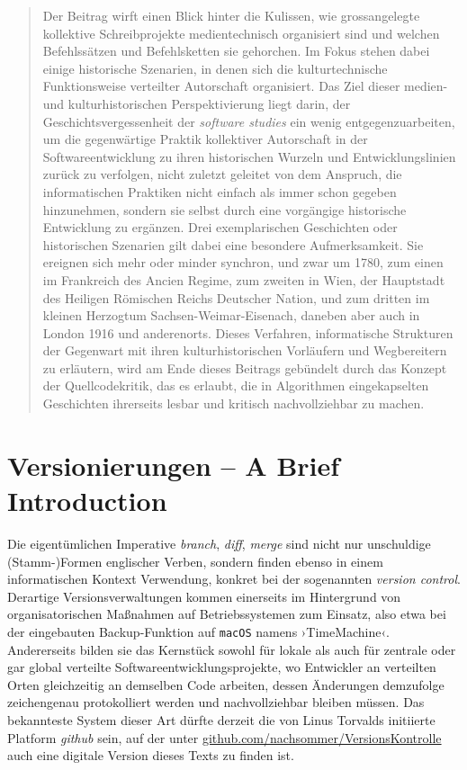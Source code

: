 \documentclass[a4paper,12pt]{article}
\newcommand{\inanf}[1]{›#1‹}
\begin{document}
\begin{abstract}
Der Beitrag wirft einen Blick hinter die Kulissen, wie grossangelegte kollektive Schreibprojekte medientechnisch organisiert sind und welchen Befehlssätzen und Befehlsketten sie gehorchen. Im Fokus stehen dabei einige historische Szenarien, in denen sich die kulturtechnische Funktionsweise verteilter Autorschaft organisiert. Das Ziel dieser medien- und kulturhistorischen Perspektivierung liegt darin, der Geschichtsvergessenheit der \emph{software studies} ein wenig entgegenzuarbeiten, um die gegenwärtige Praktik kollektiver Autorschaft in der Softwareentwicklung zu ihren historischen Wurzeln und Entwicklungslinien zurück zu verfolgen, nicht zuletzt geleitet von dem Anspruch, die informatischen Praktiken nicht einfach als immer schon gegeben hinzunehmen, sondern sie selbst durch eine vorgängige historische Entwicklung zu ergänzen. Drei exemplarischen Geschichten oder historischen Szenarien gilt dabei eine besondere Aufmerksamkeit. Sie ereignen sich mehr oder minder synchron, und zwar um 1780, zum einen im Frankreich des Ancien Regime, zum zweiten in Wien, der Hauptstadt des Heiligen Römischen Reichs Deutscher Nation, und zum dritten im kleinen Herzogtum Sachsen-Weimar-Eisenach, daneben aber auch in London 1916 und anderenorts. Dieses Verfahren, informatische Strukturen der Gegenwart mit ihren kulturhistorischen Vorläufern und Wegbereitern zu erläutern, wird am Ende dieses Beitrags gebündelt durch das Konzept der Quellcodekritik, das es erlaubt, die in Algorithmen eingekapselten Geschichten ihrerseits lesbar und kritisch nachvollziehbar zu machen. 
\end{abstract}



\section{Versionierungen – A Brief Introduction}

Die eigentümlichen Imperative \emph{branch}, \emph{diff}, \emph{merge} sind nicht nur unschuldige (Stamm-)Formen englischer Verben, sondern finden ebenso in einem informatischen Kontext Verwendung, konkret bei der sogenannten \emph{version control}. Derartige Versionsverwaltungen kommen einerseits im Hintergrund von organisatorischen Maßnahmen auf Betriebssystemen zum Einsatz, also etwa bei der eingebauten Backup-Funktion auf \verb+macOS+ namens \inanf{TimeMachine}. Andererseits bilden sie das Kernstück sowohl für lokale als auch für zentrale oder gar global verteilte Softwareentwicklungsprojekte, wo Entwickler an verteilten Orten gleichzeitig an demselben Code arbeiten, dessen Änderungen demzufolge zeichengenau protokolliert werden und nachvollziehbar bleiben müssen. Das bekannteste System dieser Art dürfte derzeit die von Linus Torvalds initiierte Platform \emph{github} sein, auf der unter \href{https://github.com/nachsommer/VersionsKontrolle}{github.com/nachsommer/VersionsKontrolle} auch eine digitale Version dieses Texts zu finden ist. 
\end{document}
